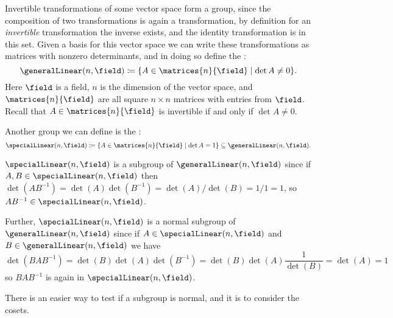 \begin{exm}{}{}
    Invertible transformations of some vector space form a group, since the composition of two transformations is again a transformation, by definition for an \emph{invertible} transformation the inverse exists, and the identity transformation is in this set.
    Given a basis for this vector space we can write these transformations as matrices with nonzero determinants, and in doing so define the :
    \begin{equation}
        \generalLinear(n, \field) \coloneqq \{A \in \matrices{n}{\field} \mid \det A \ne 0\}.
    \end{equation}
    Here \(\field\) is a field, \(n\) is the dimension of the vector space, and \(\matrices{n}{\field}\) are all square \(n\times n\) matrices with entries from \(\field\).
    Recall that \(A \in \matrices{n}{\field}\) is invertible if and only if \(\det A \ne 0\).
    
    Another group we can define is the :
    \begin{equation}
        \specialLinear(n, \field) \coloneqq \{A \in \matrices{n}{\field} \mid \det A = 1\} \subseteq \generalLinear(n, \field).
    \end{equation}
    
    \(\specialLinear(n, \field)\) is a subgroup of \(\generalLinear(n, \field)\) since if \(A, B \in \specialLinear(n, \field)\) then \(\det(AB^{-1}) = \det(A)\det(B^{-1}) = \det(A)/\det(B) = 1/1 = 1\), so \(AB^{-1} \in \specialLinear(n, \field)\).
    
    Further, \(\specialLinear(n, \field)\) is a normal subgroup of \(\generalLinear(n, \field)\) since if \(A \in \specialLinear(n, \field)\) and \(B \in \generalLinear(n, \field)\) we have
    \begin{equation*}
        \det(BAB^{-1}) = \det(B)\det(A)\det(B^{-1}) = \det(B)\det(A)\frac{1}{\det(B)} = \det(A) = 1
    \end{equation*}
    so \(BAB^{-1}\) is again in \(\specialLinear(n, \field)\).
\end{exm}

There is an easier way to test if a subgroup is normal, and it is to consider the cosets.

